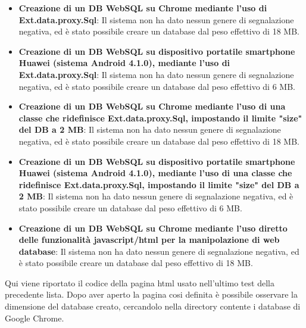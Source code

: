 \documentclass[10pt,a4paper,onecolumn]{article}
\begin{document}
\begin{itemize}
	\item \textbf{Creazione di un DB WebSQL su Chrome mediante l'uso di Ext.data.proxy.Sql}: Il sistema non ha dato nessun genere di segnalazione negativa, ed è stato possibile creare un database dal peso effettivo di 18 MB.
	\item \textbf{Creazione di un DB WebSQL su dispositivo portatile smartphone Huawei (sistema Android 4.1.0), mediante l'uso di Ext.data.proxy.Sql}: Il sistema non ha dato nessun genere di segnalazione negativa, ed è stato possibile creare un database dal peso effettivo di 6 MB.
	\item \textbf{Creazione di un DB WebSQL su Chrome mediante l'uso di una classe che ridefinisce Ext.data.proxy.Sql, impostando il limite "size" del DB a 2 MB}: Il sistema non ha dato nessun genere di segnalazione negativa, ed è stato possibile creare un database dal peso effettivo di 18 MB.
	\item \textbf{Creazione di un DB WebSQL su dispositivo portatile smartphone Huawei (sistema Android 4.1.0), mediante l'uso di una classe che ridefinisce Ext.data.proxy.Sql, impostando il limite "size" del DB a 2 MB}: Il sistema non ha dato nessun genere di segnalazione negativa, ed è stato possibile creare un database dal peso effettivo di 6 MB.
		\item \textbf{Creazione di un DB WebSQL su Chrome mediante l'uso diretto delle funzionalità javascript/html per la manipolazione di web database}: Il sistema non ha dato nessun genere di segnalazione negativa, ed è stato possibile creare un database dal peso effettivo di 18 MB.
\end{itemize}

Qui viene riportato il codice della pagina html usato nell'ultimo test della precedente lista. Dopo aver aperto la pagina cosi definita è possibile osservare la dimensione del database creato, cercandolo nella directory contente i database di Google Chrome. %
\end{document}
